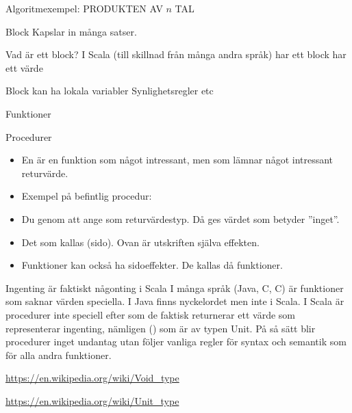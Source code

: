 \begin{Slide}{Algoritmexempel: PRODUKTEN AV $n$ TAL}
\end{Slide}



\begin{Slide}{Block}\SlideFontSmall
Kapslar in många satser.

Vad är ett block?
I Scala (till skillnad från många andra språk) har ett block har ett värde 

\end{Slide}

\begin{Slide}{Block kan ha lokala variabler}\SlideFontSmall
Synlighetsregler etc
\end{Slide}


\begin{Slide}{Funktioner}\SlideFontSmall
\end{Slide}

\begin{Slide}{Procedurer}\SlideFontSmall
\begin{itemize}
\item En  är en funktion som  något intressant, men som  lämnar något intressant returvärde.
\item Exempel på befintlig procedur: 
\item Du  genom att ange \texttt{} som returvärdestyp. Då ges värdet \texttt{\Alert{()}} som betyder ''inget''.
\end{itemize}
\begin{itemize}
\item Det som  kallas (sido). Ovan är utskriften själva effekten.
\item Funktioner kan också ha sidoeffekter. De kallas då  funktioner.
\end{itemize}
\end{Slide}

\begin{Slide}{Ingenting är faktiskt någonting i Scala}
I många språk (Java, C, C) är funktioner som saknar värden speciella. I Java finns nyckelordet   men inte i Scala. I Scala är procedurer inte speciell efter som de faktisk returnerar ett värde som representerar ingenting, nämligen () som är av typen Unit. På så sätt blir procedurer inget undantag utan följer vanliga regler för syntax och semantik som för alla andra funktioner.

\url{https://en.wikipedia.org/wiki/Void_type}

\url{https://en.wikipedia.org/wiki/Unit_type}
\end{Slide}

